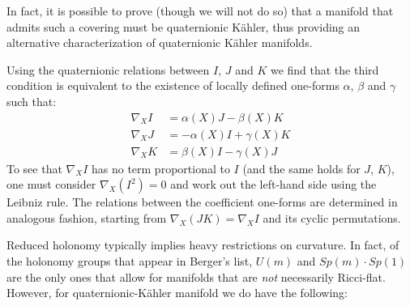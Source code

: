 \begin{rem}\leavevmode
	\begin{numberedlist}
		\item In fact, it is possible to prove (though we will not do so) that a manifold that admits such a covering must be quaternionic K\"ahler, thus providing an alternative characterization of quaternionic K\"ahler manifolds.
		\item Using the quaternionic relations between $I$, $J$ and $K$ we find that the third condition is equivalent to the existence of locally defined one-forms $\alpha$, $\beta$ and $\gamma$ such that:
		\begin{align*}
			\nabla_X I&= \alpha(X)J - \beta(X)K\\
			\nabla_X J&= -\alpha(X)I + \gamma(X)K\\
			\nabla_X K&= \beta(X)I - \gamma(X)J
		\end{align*}
		To see that $\nabla_X I$ has no term proportional to $I$ (and the same holds for $J$, $K$), one must consider $\nabla_X (I^2)=0$ and work out the left-hand side using the Leibniz rule. The relations between the coefficient one-forms are determined in analogous fashion, starting from $\nabla_X(JK)=\nabla_X I$ and its cyclic permutations.
	\end{numberedlist}
\end{rem}

Reduced holonomy typically implies heavy restrictions on curvature. In fact, of the holonomy groups that appear in Berger's list, $U(m)$ and $Sp(m)\cdot Sp(1)$ are the only ones that allow for manifolds that are \emph{not} necessarily Ricci-flat. However, for quaternionic-K\"ahler manifold we do have the following:


